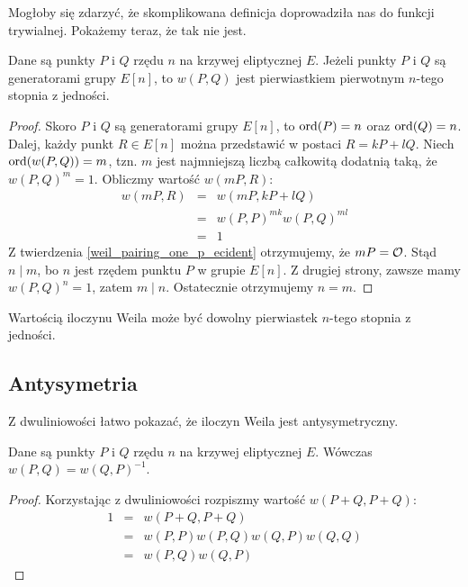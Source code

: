 \noindent
Mogłoby się zdarzyć, że skomplikowana definicja doprowadziła nas
do funkcji trywialnej.
Pokażemy teraz, że tak nie jest.

\begin{theorem}
Dane są punkty $P$ i $Q$ rzędu $n$ na krzywej eliptycznej $E$.
Jeżeli punkty $P$ i $Q$ są generatorami grupy $E[n]$,
to $w(P, Q)$ jest pierwiastkiem pierwotnym $n$-tego stopnia z jedności.
\end{theorem}

\begin{proof}
Skoro $P$ i $Q$ są generatorami grupy $E[n]$,
to $\operatorname{ord}(P) = n$ oraz $\operatorname{ord}(Q) = n$.
Dalej, każdy punkt $R \in E[n]$ można przedstawić w postaci $R = kP + lQ$.
Niech $\operatorname{ord}(w(P,Q)) = m$,
tzn. $m$ jest najmniejszą liczbą całkowitą dodatnią taką,
że $w(P,Q)^m = 1$.
Obliczmy wartość $w(mP, R)$:
\begin{eqnarray*}
w(mP, R)
& = & w(mP, kP + lQ) \\
& = & w(P,P)^{mk}w(P,Q)^{ml} \\
& = & 1
\end{eqnarray*}
Z twierdzenia \ref{weil_pairing_one_p_ecident} otrzymujemy,
że $mP = \mathcal{O}$. Stąd $n \mid m$, bo $n$ jest rzędem punktu $P$
w grupie $E[n]$. Z drugiej strony, zawsze mamy $w(P, Q)^n = 1$,
zatem $m \mid n$. Ostatecznie otrzymujemy $n = m$.
\end{proof}

\begin{corollary}
Wartością iloczynu Weila
może być dowolny pierwiastek $n$-tego stopnia z jedności.
\end{corollary}

\subsection*{Antysymetria}

\noindent
Z dwuliniowości łatwo pokazać, że iloczyn Weila jest antysymetryczny.

\begin{theorem}
Dane są punkty $P$ i $Q$ rzędu $n$ na krzywej eliptycznej $E$.
Wówczas $w(P, Q) = w(Q, P)^{-1}$.
\end{theorem}

\begin{proof}
Korzystając z dwuliniowości rozpiszmy wartość $w(P + Q, P + Q)$:
\begin{eqnarray*}
1
& = & w(P + Q, P + Q) \\
& = & w(P,P)w(P,Q)w(Q,P)w(Q,Q) \\
& = & w(P, Q)w(Q, P)
\end{eqnarray*}
\end{proof}
